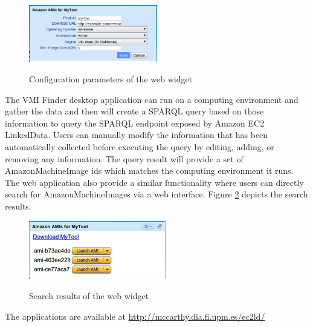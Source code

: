 \begin{figure}[h!t!]
  \caption{Configuration parameters of the web widget}
  \centering
    \includegraphics[width=0.5\textwidth]{gadget-config.png}
   \label{fig:config}
\end{figure}



The VMI Finder desktop application can run on a computing environment and gather the data and then will create a SPARQL query based on those information to query the SPARQL endpoint exposed by Amazon EC2 LinkedData. Users can manually modify the information that has been automatically collected before executing the query by editing, adding, or removing any information. The query result will provide a set of AmazonMachineImage ids which matches the computing environment it runs. The web application also provide a similar functionality where users can directly search for AmazonMachineImages via a web interface. Figure \ref{fig:results} depicts the search results.

\begin{figure}[h!t!]
  \caption{Search results of the web widget}
  \centering
    \includegraphics[scale=0.8]{gadget-results.png}
   \label{fig:results}
\end{figure}

The applications are available at \url{http://mccarthy.dia.fi.upm.es/ec2ld/}